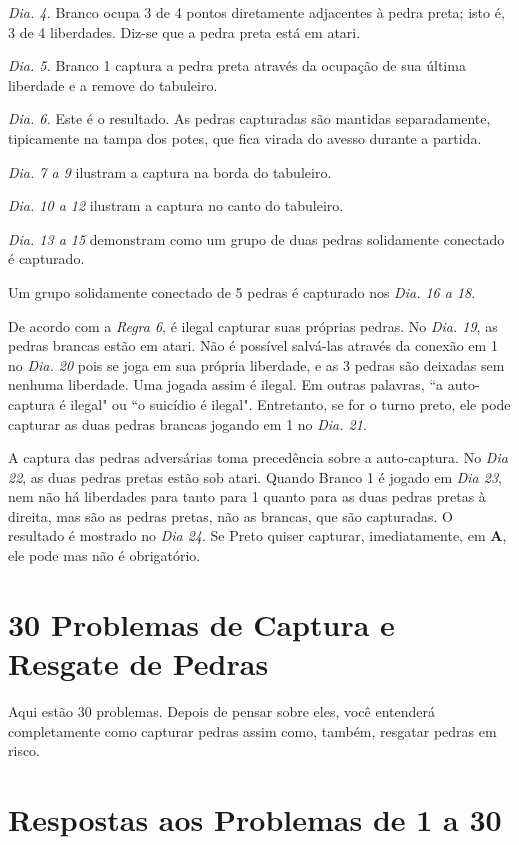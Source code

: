 \emph{Dia. 4.} Branco ocupa 3 de 4 pontos diretamente adjacentes à pedra preta; isto é, 3 de 4 liberdades. Diz-se que a pedra preta está em atari.

\emph{Dia. 5.} Branco 1 captura a pedra preta através da ocupação de sua última liberdade e a remove do tabuleiro.

\emph{Dia. 6.} Este é o resultado. As pedras capturadas são mantidas separadamente, tipicamente na tampa dos potes, que fica virada do avesso durante a partida.

\emph{Dia. 7 a 9} ilustram a captura na borda do tabuleiro.

\emph{Dia. 10 a 12} ilustram a captura  no canto do tabuleiro.

\emph{Dia. 13 a 15} demonstram  como um grupo de duas pedras solidamente conectado é capturado.

Um grupo solidamente conectado de 5 pedras é capturado nos \emph{Dia. 16 a 18}.

De acordo com a \emph{Regra 6}, é ilegal capturar suas próprias pedras. No \emph{Dia. 19}, as pedras brancas estão em atari. Não é possível salvá-las através da conexão em 1 no \emph{Dia. 20} pois se joga em sua própria liberdade, e as 3 pedras são deixadas sem nenhuma liberdade. Uma jogada assim é ilegal. Em outras palavras, ``a auto-captura é ilegal" ou ``o suicídio é ilegal". Entretanto, se for o turno preto, ele pode capturar as duas pedras brancas jogando em 1 no \emph{Dia. 21}.

A captura das pedras adversárias toma precedência sobre a auto-captura. No \emph{Dia 22}, as duas pedras pretas estão sob atari. Quando Branco 1 é jogado em \emph{Dia 23}, nem não há liberdades para tanto para 1 quanto para as duas pedras pretas à direita, mas são as pedras pretas, não as brancas, que são capturadas. O resultado é mostrado no \emph{Dia 24}. Se Preto quiser capturar, imediatamente, em \textbf{A}, ele pode mas não é obrigatório.

\section{30 Problemas de Captura e Resgate de Pedras}

Aqui estão 30 problemas. Depois de pensar sobre eles, você entenderá completamente como capturar pedras assim como, também, resgatar pedras em risco.

\section{Respostas aos Problemas de 1 a 30}

